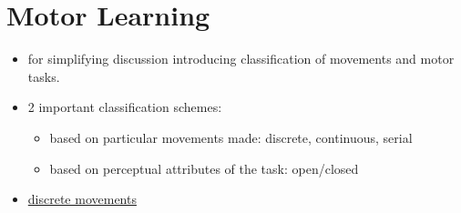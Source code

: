 \section{Motor Learning}
\begin{itemize}
	\item for simplifying discussion introducing classification of movements and motor tasks.
	\item 2 important classification schemes:
	\begin{itemize}
		\item based on particular movements made: discrete, continuous, serial
		\item based on perceptual attributes of the task: open/closed
	\end{itemize}
	\item \underline{discrete movements}
\end{itemize}
